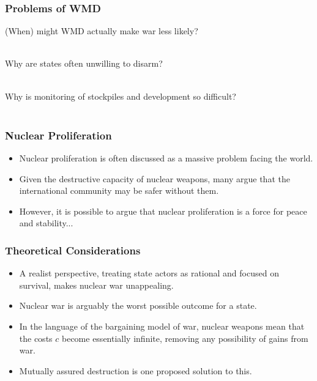 \documentclass[handout]{beamer}
\begin{document}
\begin{frame} 
\frametitle{\LARGE{Problems of WMD}}
\begin{itemize}
	\Large{
		\item (When) might WMD actually make war less likely? \pause
		\\~\\ 
		\item Why are states often unwilling to disarm? \pause
		\\~\\ 
		\item Why is monitoring of stockpiles and development so difficult? 
		\\~\\

	}
\end{itemize}
\end{frame}

\begin{frame} 
\frametitle{\LARGE{Nuclear Proliferation}}
\begin{itemize}

		\item Nuclear proliferation is often discussed as a massive problem facing the world. \pause
		\item Given the destructive capacity of nuclear weapons, many argue that the international community may be safer without them. \pause
		\item However, it is possible to argue that nuclear proliferation is a force for peace and stability...
	
\end{itemize}
\end{frame}

\begin{frame} 
\frametitle{\LARGE{Theoretical Considerations}}
\begin{itemize}

		\item A realist perspective, treating state actors as rational and focused on survival, makes nuclear war unappealing. \pause
		\item Nuclear war is arguably the worst possible outcome for a state. \pause
		\item In the language of the bargaining model of war, nuclear weapons mean that the costs $c$ become essentially infinite, removing any possibility of gains from war.
		\item Mutually assured destruction is one proposed solution to this.
	
\end{itemize}
\end{frame}
\end{document}
